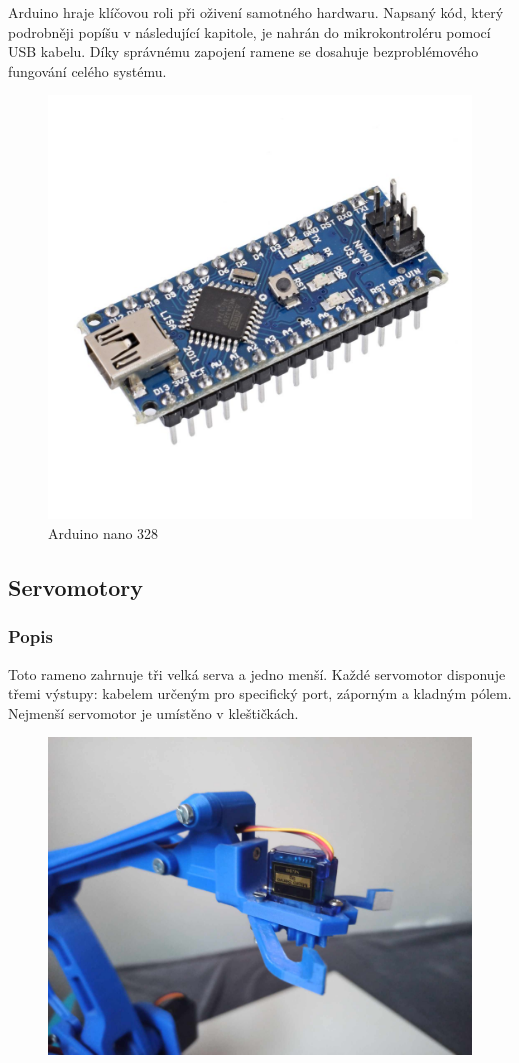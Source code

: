 \documentclass[12pt, a4paper,
twoside,        %
openright
]{report}
\begin{document}
{Arduino hraje klíčovou roli při oživení samotného hardwaru. Napsaný kód, který podrobněji popíšu v následující kapitole, je nahrán do mikrokontroléru pomocí USB kabelu. Díky správnému zapojení ramene se dosahuje bezproblémového fungování celého systému.


	\begin{figure}[h]
	
	\centering
	\includegraphics[width=0.6\linewidth]{image/arduino.jpg} 
	
	\caption{Arduino nano 328 } %
	\label{fig:Arduino} %
\end{figure}

\newpage 

\subsection{Servomotory }
\subsubsection{Popis}
	
	Toto rameno zahrnuje tři velká serva a jedno menší. Každé servomotor disponuje třemi výstupy: kabelem určeným pro specifický port, záporným a kladným pólem. 
	\\ Nejmenší servomotor je umístěno v kleštičkách.
\begin{figure}[h]
	
	\centering
	\includegraphics[width=0.5\linewidth]{image/kleste.jpg} 
	

\end{figure}}
\end{document}
